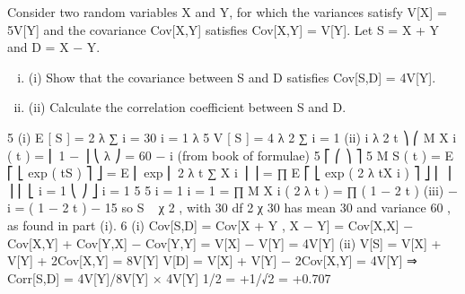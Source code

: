 \documentclass[a4paper,12pt]{article}
\begin{document}

\item Consider two random variables X and Y, for which the variances satisfy V[X] = 5V[Y]
and the covariance Cov[X,Y] satisfies Cov[X,Y] = V[Y].
Let S = X + Y and D = X − Y.
\begin{enumerate}[(i)]
\item (i)  Show that the covariance between S and D satisfies Cov[S,D] = 4V[Y].
\item (ii) Calculate the correlation coefficient between S and D.
\end{enumerate}
5
(i)
E [ S ] = 2 λ ∑
i
= 30
i = 1 λ
5
V [ S ] = 4 λ 2 ∑
i = 1
(ii)
i
λ 2
t ⎞
⎛
M X i ( t ) = ⎜ 1 − ⎟
⎝ λ ⎠
= 60
− i
(from book of formulae)
5
⎡
⎛
⎞ ⎤ 5
M S ( t ) = E ⎡ ⎣ exp ( tS ) ⎤ ⎦ = E ⎢ exp ⎜ 2 λ t ∑ X i ⎟ ⎥ = ∏ E ⎡ ⎣ exp ( 2 λ tX i ) ⎤ ⎦
⎜
⎟ ⎥
⎢ ⎣
i = 1
⎝
⎠ ⎦ i = 1
5 5
i = 1 i = 1
= ∏ M X i ( 2 λ t ) = ∏ ( 1 − 2 t )
(iii)
− i
= ( 1 − 2 t )
− 15
so S ~ χ 2 , with 30 df
2
χ 30
has mean 30 and variance 60 , as found in part (i).
6
(i) Cov[S,D] = Cov[X + Y , X − Y] = Cov[X,X] − Cov[X,Y] + Cov[Y,X] − Cov[Y,Y]
= V[X] − V[Y] = 4V[Y]
(ii) V[S] = V[X] + V[Y] + 2Cov[X,Y] = 8V[Y]
V[D] = V[X] + V[Y] − 2Cov[X,Y] = 4V[Y]
⇒ Corr[S,D] = 4V[Y]/{8V[Y] × 4V[Y]} 1/2 = +1/√2 = +0.707
\end{document}
